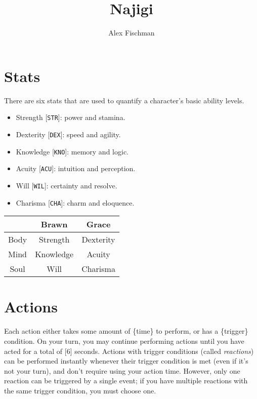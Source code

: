 \documentclass[12pt]{article}
\title{Najigi}
\author{Alex Fischman}
\newcommand{\STR}{\texttt{STR}}
\newcommand{\DEX}{\texttt{DEX}}
\newcommand{\KNO}{\texttt{KNO}}
\newcommand{\ACU}{\texttt{ACU}}
\newcommand{\WIL}{\texttt{WIL}}
\newcommand{\CHA}{\texttt{CHA}}
\begin{document}
\maketitle
\tableofcontents
\clearpage

\pagebreak
\section{Stats}

There are six stats that are used to quantify a character's basic ability levels.

\begin{multicols}{2}

\begin{itemize}
\item Strength [\STR]: power and stamina.
\item Dexterity [\DEX]: speed and agility.
\item Knowledge [\KNO]: memory and logic.
\item Acuity [\ACU]: intuition and perception.
\item Will [\WIL]: certainty and resolve.
\item Charisma [\CHA]: charm and eloquence.
\end{itemize}

\columnbreak

\begin{tabularx}{\linewidth}{C|C C}
& Brawn & Grace \\\hline
Body & Strength & Dexterity \\
Mind & Knowledge & Acuity \\
Soul & Will & Charisma
\end{tabularx}

\end{multicols}

\pagebreak
\section{Actions}

Each action either takes some amount of \{time\} to perform, or has a \{trigger\} condition. On your turn, you may continue performing actions until you have acted for a total of [6] seconds. Actions with trigger conditions (called \textit{reactions}) can be performed instantly whenever their trigger condition is met (even if it’s not your turn), and don’t require using your action time. However, only one reaction can be triggered by a single event; if you have multiple reactions with the same trigger condition, you must choose one.
\end{document}
